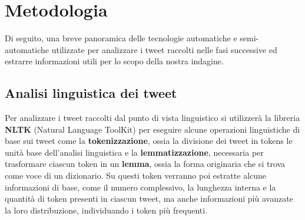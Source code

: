 \chapter{Metodologia}
Di seguito, una breve panoramica delle tecnologie automatiche e semi-automatiche utilizzate per analizzare i tweet raccolti nelle fasi successive ed estrarre informazioni utili per lo scopo della nostra indagine.

\section{Analisi linguistica dei tweet}
Per analizzare i tweet raccolti dal punto di vista linguistico si utilizzerà la libreria \textbf{NLTK} (Natural Language ToolKit) per eseguire alcune operazioni linguistiche di base sui tweet come la \textbf{tokenizzazione}, ossia la divisione dei tweet in tokens le unità base dell'analisi linguistica e la \textbf{lemmatizzazione}, necessaria per trasformare ciascun token in un \textbf{lemma}, ossia la forma originaria che si trova come voce di un dizionario.
Su questi token verranno poi estratte alcune informazioni di base, come il numero complessivo, la lunghezza interna e la quantità di token presenti in ciascun tweet, ma anche informazioni più avanzate la loro distribuzione, individuando i token più frequenti.


